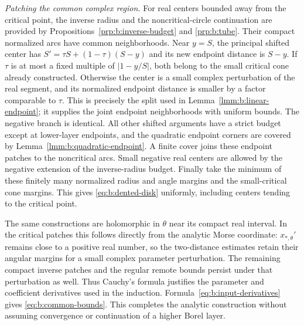 \begin{prf}
\smallskip\noindent
\emph{Patching the common complex region.}
For real centers bounded away from the critical point, the inverse
radius and the noncritical-circle continuation are provided by
Propositions~\ref{prp:b:inverse-budget} and \ref{prp:b:tube}.
Their compact normalized arcs have common neighborhoods.
Near $y=S$, the principal shifted center has
$S'=\tau S+(1-\tau)(S-y)$ and its new endpoint distance is
$S-y$. If $\tau$ is at most a fixed multiple of $|1-y/S|$,
both belong to the small critical cone already constructed.
Otherwise the center is a small complex perturbation of the real
segment, and its normalized endpoint distance is smaller by a
factor comparable to $\tau$. This is precisely the split used in
Lemma~\ref{lmm:b:linear-endpoint}; it supplies the joint endpoint
neighborhoods with uniform bounds. The negative branch is identical.
All other shifted arguments have a strict budget except at lower-layer
endpoints, and the quadratic endpoint corners are covered by
Lemma~\ref{lmm:b:quadratic-endpoint}. A finite cover joins these
endpoint patches to the noncritical arcs. Small negative real centers
are allowed by the negative extension of the inverse-radius budget.
Finally take the minimum of these finitely many normalized radius
and angle margins and the small-critical cone margins.
This gives \eqref{eq:b:dented-disk} uniformly, including centers
tending to the critical point.

The same constructions are holomorphic in $\theta$ near its compact
real interval. In the critical patches this follows directly from
the analytic Morse coordinate: $x_{*,\theta}'$ remains close to a
positive real number, so the two-distance estimates retain their
angular margins for a small complex parameter perturbation. The
remaining compact inverse patches and the regular remote bounds
persist under that perturbation as well. Thus Cauchy's formula
justifies the parameter and coefficient derivatives used in the
induction. Formula~\eqref{eq:b:input-derivatives} gives
\eqref{eq:b:common-bounds}. This completes the analytic construction
without assuming convergence or continuation of a higher Borel layer.
\end{prf}
